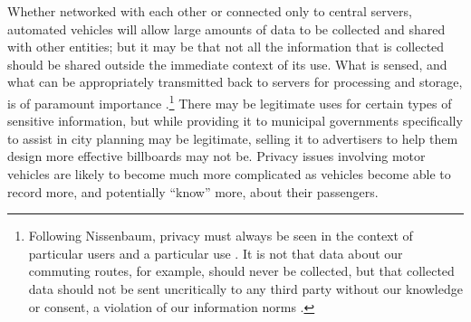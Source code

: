 Whether networked with each other or connected only to central
servers, automated vehicles will allow large amounts of data to be collected
and shared with other entities; but it may be that not all the
information that is collected should be shared outside the immediate
context of its use. What is sensed, and what can be appropriately
transmitted back to servers for processing and storage, is of
paramount importance
\cite{nissenbaum}.\footnote{Following Nissenbaum, privacy must always
  be seen in the context of 
particular users and a particular use \cite[p. 2]{nissenbaum}. It is not that data about our
commuting routes, for example, should never be collected, but that collected data
should not be sent uncritically to any third party without our
knowledge or consent, a violation of our information norms \cite[p.
  3]{nissenbaum}.}
There may be legitimate uses for certain types of sensitive information, but
while providing it to municipal governments specifically to assist in
city planning may be legitimate, selling it to advertisers to help
them design more effective billboards may not be. Privacy issues
involving motor vehicles are likely to become much more complicated as
vehicles become able to record more, and potentially ``know'' more,
about their passengers.



